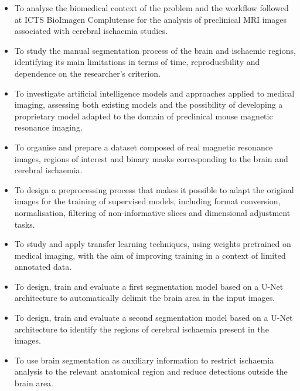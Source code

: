 \begin{itemize}
    \item[\textbf{O1.}] To analyse the biomedical context of the problem and the workflow followed at ICTS BioImagen Complutense for the analysis of preclinical MRI images associated with cerebral ischaemia studies.

    \item[\textbf{O2.}] To study the manual segmentation process of the brain and ischaemic regions, identifying its main limitations in terms of time, reproducibility and dependence on the researcher's criterion.

    \item[\textbf{O3.}] To investigate artificial intelligence models and approaches applied to medical imaging, assessing both existing models and the possibility of developing a proprietary model adapted to the domain of preclinical mouse magnetic resonance imaging.

    \item[\textbf{O4.}] To organise and prepare a dataset composed of real magnetic resonance images, regions of interest and binary masks corresponding to the brain and cerebral ischaemia.

    \item[\textbf{O5.}] To design a preprocessing process that makes it possible to adapt the original images for the training of supervised models, including format conversion, normalisation, filtering of non-informative slices and dimensional adjustment tasks.

    \item[\textbf{O6.}] To study and apply transfer learning techniques, using weights pretrained on medical imaging, with the aim of improving training in a context of limited annotated data.

    \item[\textbf{O7.}] To design, train and evaluate a first segmentation model based on a U-Net architecture to automatically delimit the brain area in the input images.

    \item[\textbf{O8.}] To design, train and evaluate a second segmentation model based on a U-Net architecture to identify the regions of cerebral ischaemia present in the images.

    \item[\textbf{O9.}] To use brain segmentation as auxiliary information to restrict ischaemia analysis to the relevant anatomical region and reduce detections outside the brain area.


\end{itemize}
